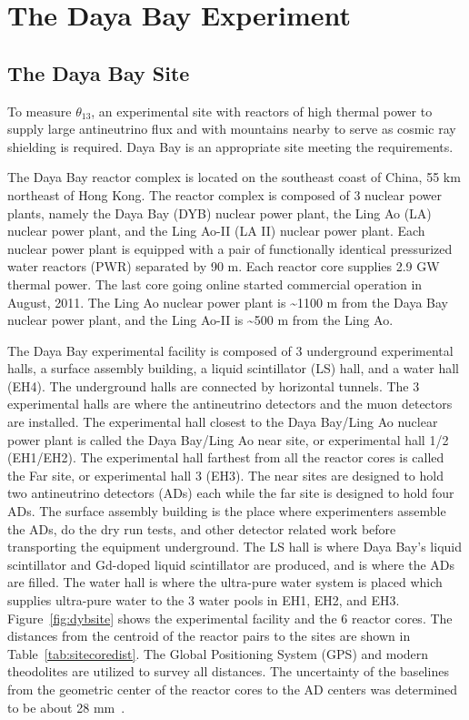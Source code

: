 \chapter{The Daya Bay Experiment}

\section{The Daya Bay Site}
To measure $\theta_{13}$, an experimental site with reactors of high thermal power to supply large antineutrino flux and with mountains nearby to serve as cosmic ray shielding is required. Daya Bay is an appropriate site meeting the requirements.

The Daya Bay reactor complex is located on the southeast coast of China, 55 km northeast of Hong Kong. The reactor complex is composed of 3 nuclear power plants, namely the Daya Bay (DYB) nuclear power plant, the Ling Ao (LA) nuclear power plant, and the Ling Ao-II (LA II) nuclear power plant. Each nuclear power plant is equipped with a pair of functionally identical pressurized water reactors (PWR) separated by 90 m. Each reactor core supplies 2.9 GW thermal power. The last core going online started commercial operation in August, 2011. The Ling Ao nuclear power plant is \textasciitilde 1100 m from the Daya Bay nuclear power plant, and the Ling Ao-II is \textasciitilde 500 m from the Ling Ao.

The Daya Bay experimental facility is composed of 3 underground experimental halls, a surface assembly building, a liquid scintillator (LS) hall, and a water hall (EH4). The underground halls are connected by horizontal tunnels. The 3 experimental halls are where the antineutrino detectors and the muon detectors are installed. The experimental hall closest to the Daya Bay/Ling Ao nuclear power plant is called the Daya Bay/Ling Ao near site, or experimental hall 1/2 (EH1/EH2). The experimental hall farthest from all the reactor cores is called the Far site, or experimental hall 3 (EH3). The near sites are designed to hold two antineutrino detectors (ADs) each while the far site is designed to hold four ADs. The surface assembly building is the place where experimenters assemble the ADs, do the dry run tests, and other detector related work before transporting the equipment underground. The LS hall is where Daya Bay's liquid scintillator and Gd-doped liquid scintillator are produced, and is where the ADs are filled. The water hall is where the ultra-pure water system is placed which supplies ultra-pure water to the 3 water pools in EH1, EH2, and EH3. Figure~\ref{fig:dybsite} shows the experimental facility and the 6 reactor cores. The distances from the centroid of the reactor pairs to the sites are shown in Table~\ref{tab:sitecoredist}. The Global Positioning System (GPS) and modern theodolites are utilized to survey all distances. The uncertainty of the baselines from the geometric center of the reactor cores to the AD centers was determined to be about 28 mm~\cite{dayabay2012_1}.

